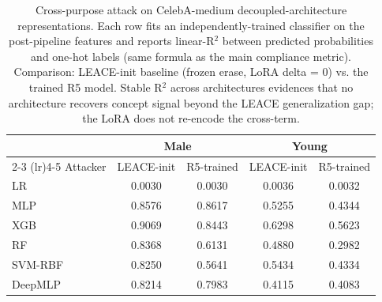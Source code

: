 \begin{table}[t]
  \centering
  \caption{Cross-purpose attack on CelebA-medium decoupled-architecture
  representations. Each row fits an independently-trained classifier on the
  post-pipeline features and reports linear-R$^2$ between predicted
  probabilities and one-hot labels (same formula as the main compliance
  metric). Comparison: LEACE-init baseline (frozen erase, LoRA delta = 0)
  vs. the trained R5 model. Stable R$^2$ across architectures evidences that
  no architecture recovers concept signal beyond the LEACE generalization
  gap; the LoRA does not re-encode the cross-term.}
  \label{tab:celeba-cross-purpose}
  \begin{tabular}{lcccc}
    \toprule
    & \multicolumn{2}{c}{Male} & \multicolumn{2}{c}{Young} \\
    \cmidrule(lr){2-3} \cmidrule(lr){4-5}
    Attacker & LEACE-init & R5-trained & LEACE-init & R5-trained \\
    \midrule
    LR       & 0.0030 & 0.0030 & 0.0036 & 0.0032 \\
    MLP      & 0.8576 & 0.8617 & 0.5255 & 0.4344 \\
    XGB      & 0.9069 & 0.8443 & 0.6298 & 0.5623 \\
    RF       & 0.8368 & 0.6131 & 0.4880 & 0.2982 \\
    SVM-RBF  & 0.8250 & 0.5641 & 0.5434 & 0.4334 \\
    DeepMLP  & 0.8214 & 0.7983 & 0.4115 & 0.4083 \\
    \bottomrule
  \end{tabular}
\end{table}
